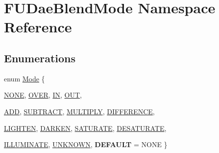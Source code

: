 \hypertarget{namespaceFUDaeBlendMode}{
\section{FUDaeBlendMode Namespace Reference}
\label{namespaceFUDaeBlendMode}
}
\subsection*{Enumerations}
\begin{DoxyCompactItemize}
\item 
enum \hyperlink{namespaceFUDaeBlendMode_a4b5f740c497b45148449914ab987d2c1}{Mode} \{ \par
\hyperlink{namespaceFUDaeBlendMode_a4b5f740c497b45148449914ab987d2c1a1f309ed4c3d0f83edb527d9715541da6}{NONE}, 
\hyperlink{namespaceFUDaeBlendMode_a4b5f740c497b45148449914ab987d2c1a0b8bf8120e6dbe2ac50e98fa7f817922}{OVER}, 
\hyperlink{namespaceFUDaeBlendMode_a4b5f740c497b45148449914ab987d2c1a48a0c7eb514f06eecbdb54eedcf7affe}{IN}, 
\hyperlink{namespaceFUDaeBlendMode_a4b5f740c497b45148449914ab987d2c1a1189f04dd3eb88ef54b8d108458338da}{OUT}, 
\par
\hyperlink{namespaceFUDaeBlendMode_a4b5f740c497b45148449914ab987d2c1a0cddf6b1ea67860cb3dbb2946e8b407e}{ADD}, 
\hyperlink{namespaceFUDaeBlendMode_a4b5f740c497b45148449914ab987d2c1a4a75c303418c424e76aef2c1fd71a600}{SUBTRACT}, 
\hyperlink{namespaceFUDaeBlendMode_a4b5f740c497b45148449914ab987d2c1aefcc51f77a033dc800f62d9dbc8c7160}{MULTIPLY}, 
\hyperlink{namespaceFUDaeBlendMode_a4b5f740c497b45148449914ab987d2c1a47bcd4b7022ffb9ddfbdacfdc582a26a}{DIFFERENCE}, 
\par
\hyperlink{namespaceFUDaeBlendMode_a4b5f740c497b45148449914ab987d2c1a51b9f58b959f95c3c809109cceda3f77}{LIGHTEN}, 
\hyperlink{namespaceFUDaeBlendMode_a4b5f740c497b45148449914ab987d2c1ae5f22ac3ebcbb86d20e823d5a634163f}{DARKEN}, 
\hyperlink{namespaceFUDaeBlendMode_a4b5f740c497b45148449914ab987d2c1a140fe1e4b833202a02eac13b46777f6b}{SATURATE}, 
\hyperlink{namespaceFUDaeBlendMode_a4b5f740c497b45148449914ab987d2c1ae5bf89939503476018aa9d7273d68eae}{DESATURATE}, 
\par
\hyperlink{namespaceFUDaeBlendMode_a4b5f740c497b45148449914ab987d2c1ada42fedc01f80e583aedeed4084eb64a}{ILLUMINATE}, 
\hyperlink{namespaceFUDaeBlendMode_a4b5f740c497b45148449914ab987d2c1a73ea3ac15afde68391507428f6fa2681}{UNKNOWN}, 
{\bfseries DEFAULT} =  NONE
 \}
\end{DoxyCompactItemize}
